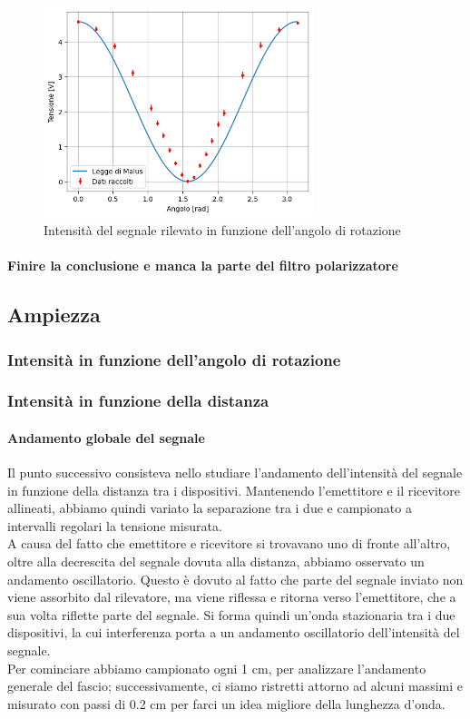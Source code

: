 \documentclass[letterpaper,12pt]{article}
\begin{document}
\begin{figure}[h!]
    \centering
    \includegraphics[width = 0.7\textwidth]{polarizzazione.png}
    \caption{Intensità del segnale rilevato in funzione dell'angolo di rotazione}
    \label{fig:polarizzazione}
\end{figure}
\paragraph*{Finire la conclusione e manca la parte del filtro polarizzatore}

\subsection{Ampiezza} 
\subsubsection{Intensità in funzione dell'angolo di rotazione}
\subsubsection{Intensità in funzione della distanza}
\paragraph*{Andamento globale del segnale}
Il punto successivo consisteva nello studiare l'andamento dell'intensità del segnale in funzione della distanza tra i 
dispositivi. Mantenendo l'emettitore e il ricevitore allineati, abbiamo quindi variato la separazione tra i due
e campionato a intervalli regolari la tensione misurata.\\
A causa del fatto che emettitore e ricevitore si trovavano uno di fronte all'altro, oltre alla decrescita
del segnale dovuta alla distanza, abbiamo osservato un andamento oscillatorio. Questo è dovuto al fatto che
parte del segnale inviato non viene assorbito dal rilevatore, ma viene riflessa e ritorna verso l'emettitore,
che a sua volta riflette parte del segnale.
Si forma quindi un'onda stazionaria tra i due dispositivi, la cui interferenza porta a un andamento oscillatorio dell'intensità del segnale.\\
Per cominciare abbiamo campionato ogni 1 cm, per analizzare l'andamento generale del fascio; successivamente, 
ci siamo ristretti attorno ad alcuni massimi e misurato con passi di 0.2 cm per farci un idea migliore della lunghezza d'onda.\\
\end{document}
